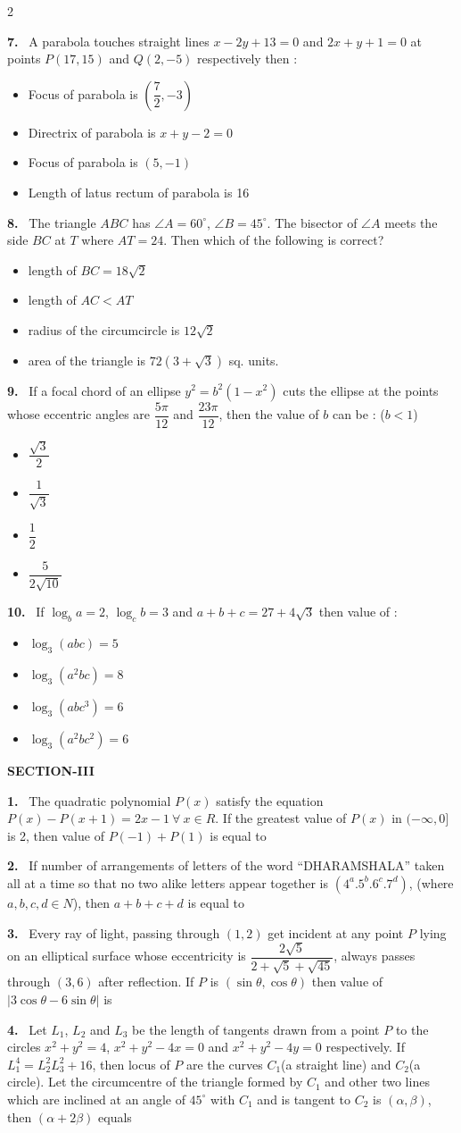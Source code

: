 \documentclass[10pt]{extarticle}
\newcommand{\sect}[1]{\par\smallskip\noindent\textbf{#1}\par}
\newcommand{\qn}[1]{\par\smallskip\noindent\textbf{#1.}~}
\newenvironment{qoptions}{\begin{itemize}[leftmargin=1.8em,itemsep=1pt,topsep=2pt,label={}]}{\end{itemize}}
\newcommand{\opt}[2]{\item[(#1)] #2}
\begin{document}
\begin{multicols}{2}
\qn{7} A parabola touches straight lines $x-2y+13=0$ and $2x+y+1=0$ at points $P(17,15)$ and $Q(2,-5)$ respectively then :
\begin{qoptions}
\opt{A}{Focus of parabola is $\left(\dfrac72,-3\right)$}
\opt{B}{Directrix of parabola is $x+y-2=0$}
\opt{C}{Focus of parabola is $(5,-1)$}
\opt{D}{Length of latus rectum of parabola is 16}
\end{qoptions}
\qn{8} The triangle $ABC$ has $\angle A=60^\circ$, $\angle B=45^\circ$. The bisector of $\angle A$ meets the side $BC$ at $T$ where $AT=24$. Then which of the following is correct?
\begin{qoptions}
\opt{A}{length of $BC=18\sqrt2$}
\opt{B}{length of $AC<AT$}
\opt{C}{radius of the circumcircle is $12\sqrt2$}
\opt{D}{area of the triangle is $72\left(3+\sqrt3\right)$ sq. units.}
\end{qoptions}
\qn{9} If a focal chord of an ellipse $y^2=b^2\left(1-x^2\right)$ cuts the ellipse at the points whose eccentric angles are $\dfrac{5\pi}{12}$ and $\dfrac{23\pi}{12}$, then the value of $b$ can be : ($b<1$)
\begin{qoptions}
\opt{A}{$\dfrac{\sqrt3}2$}
\opt{B}{$\dfrac1{\sqrt3}$}
\opt{C}{$\dfrac12$}
\opt{D}{$\dfrac5{2\sqrt{10}}$}
\end{qoptions}
\qn{10} If $\log_ba=2$, $\log_cb=3$ and $a+b+c=27+4\sqrt3$ then value of :
\begin{qoptions}
\opt{A}{$\log_3(abc)=5$}
\opt{B}{$\log_3(a^2bc)=8$}
\opt{C}{$\log_3(abc^3)=6$}
\opt{D}{$\log_3(a^2bc^2)=6$}
\end{qoptions}
\sect{SECTION-III}
\qn{1} The quadratic polynomial $P(x)$ satisfy the equation $P(x)-P(x+1)=2x-1\ \forall\ x\in R$. If the greatest value of $P(x)$ in $(-\infty,0]$ is 2, then value of $P(-1)+P(1)$ is equal to
\qn{2} If number of arrangements of letters of the word ``DHARAMSHALA'' taken all at a time so that no two alike letters appear together is $\left(4^a.5^b.6^c.7^d\right)$, (where $a,b,c,d\in N$), then $a+b+c+d$ is equal to
\qn{3} Every ray of light, passing through $(1,2)$ get incident at any point $P$ lying on an elliptical surface whose eccentricity is $\dfrac{2\sqrt5}{2+\sqrt5+\sqrt{45}}$, always passes through $(3,6)$ after reflection. If $P$ is $(\sin\theta,\cos\theta)$ then value of $|3\cos\theta-6\sin\theta|$ is
\qn{4} Let $L_1$, $L_2$ and $L_3$ be the length of tangents drawn from a point $P$ to the circles $x^2+y^2=4$, $x^2+y^2-4x=0$ and $x^2+y^2-4y=0$ respectively. If $L_1^4=L_2^2L_3^2+16$, then locus of $P$ are the curves $C_1$(a straight line) and $C_2$(a circle). Let the circumcentre of the triangle formed by $C_1$ and other two lines which are inclined at an angle of $45^\circ$ with $C_1$ and is tangent to $C_2$ is $(\alpha,\beta)$, then $(\alpha+2\beta)$ equals

\end{multicols}
\end{document}
